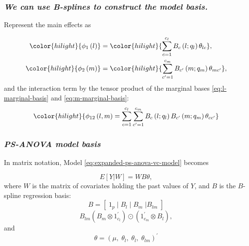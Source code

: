 \documentclass[12pt]{beamer}
\newcommand{\ms}{\scriptscriptstyle}
\newcommand{\newmaththought}[1]{{ \color{hilight} {#1}}}
\begin{document}
\begin{frame}
\frametitle{\emph{We can use B-splines to construct the model basis.}}
Represent the main effects as

\begin{align}  
\newmaththought{\phi_1\left(l\right) } &= \newmaththought{\sum_{c=1}^{c_l} B_{c}\left(l;q_l\right) \theta_{lc }}, \label{eq:l-marginal-basis}\\
\newmaththought{\phi_2\left(m\right) } &= \newmaththought{\sum_{{c^\prime}=1}^{c_m} B_{c^\prime}\left(m;q_m\right)\theta_{mc^\prime } },\label{eq:m-marginal-basis}
\end{align}
and the interaction term by the tensor product of the marginal bases \ref{eq:l-marginal-basis} and \ref{eq:m-marginal-basis}:
\begin{equation*} 
\newmaththought{ \phi_{12}\left(l,m\right)  = \sum_{c=1}^{c_l} \sum_{{c^\prime}=1}^{c_m} B_{c}\left(l;q_l\right) B_{c^\prime  }\left(m;q_m\right)\theta_{c c^\prime } }
\end{equation*} 
\end{frame}


\begin{frame}
\frametitle{\emph{PS-ANOVA model basis}}

In matrix notation, Model \ref{eq:expanded-ps-anova-vc-model} becomes

\begin{equation*}  
E \left[ Y | W \right] = WB \theta,
\end{equation*}
\noindent
where $W$ is the matrix of covariates holding the past values of $Y$, and $B$ is the $B$-spline regression basis:
\begin{equation} \label{eq:SANOVA-basis-matrix}
B = \left[\; 1_p \; \vert \;  B_l  \; \vert \;   B_m \; \vert B_{lm} \; \right]
\end{equation}
\noindent
\begin{equation*} \label{eq:rowwise-kronecker-product}
B_{lm} \left( B_m \otimes 1^\prime_{c_l} \right) \odot \left(1^\prime_{c_m} \otimes  B_l  \right),
\end{equation*}
\noindent
and
\begin{equation*} 
\theta = \left(\mu, \;\theta_{\ms l}, \;\theta_{\ms l}, \;\theta_{\ms{lm}} \right)^\prime
\end{equation*}
\end{frame}
\end{document}
